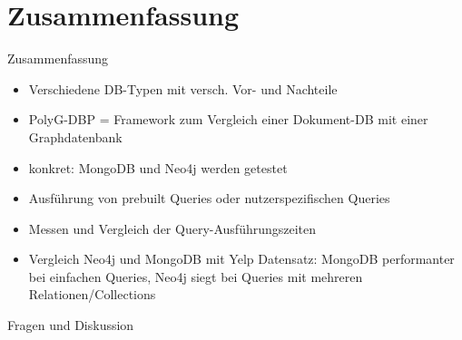 \documentclass[12pt,usenames,dvipsnames]{beamer}
\begin{document}
	\section{Zusammenfassung}
	\begin{frame}{Zusammenfassung}
	\begin{itemize}[<+- | alert@+>]
	\item Verschiedene DB-Typen mit versch. Vor- und Nachteile
	\item PolyG-DBP = Framework zum Vergleich einer Dokument-DB mit einer Graphdatenbank
	\item konkret: MongoDB und Neo4j werden getestet
	\item Ausführung von prebuilt Queries oder nutzerspezifischen Queries
	\item Messen und Vergleich der Query-Ausführungszeiten
	\item Vergleich Neo4j und MongoDB mit Yelp Datensatz: MongoDB performanter bei einfachen Queries, Neo4j siegt bei Queries mit mehreren Relationen/Collections
	\end{itemize}
	\end{frame}
\begin{frame}[standout]
  Fragen und Diskussion
\end{frame}
\end{document}
